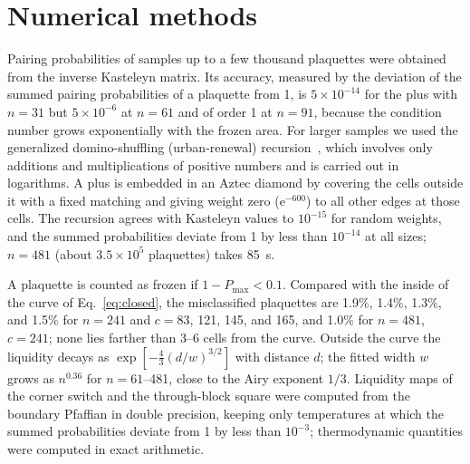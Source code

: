 \documentclass[reprint,aps,prb,floatfix,longbibliography,amsmath,amssymb]{revtex4-2}
\newcommand{\ee}{\mathrm{e}}
\newcommand{\Pmax}{P_{\max}}
\begin{document}
\section{Numerical methods}\label{app:numerics}

Pairing probabilities of samples up to a few thousand plaquettes were obtained from the inverse Kasteleyn matrix. Its accuracy, measured by the deviation of the summed pairing probabilities of a plaquette from 1, is $5\times10^{-14}$ for the plus with $n=31$ but $5\times10^{-6}$ at $n=61$ and of order 1 at $n=91$, because the condition number grows exponentially with the frozen area. For larger samples we used the generalized domino-shuffling (urban-renewal) recursion~\cite{Propp2003}, which involves only additions and multiplications of positive numbers and is carried out in logarithms. A plus is embedded in an Aztec diamond by covering the cells outside it with a fixed matching and giving weight zero ($\ee^{-600}$) to all other edges at those cells. The recursion agrees with Kasteleyn values to $10^{-15}$ for random weights, and the summed probabilities deviate from 1 by less than $10^{-14}$ at all sizes; $n=481$ (about $3.5\times10^5$ plaquettes) takes 85~s.

A plaquette is counted as frozen if $1-\Pmax<0.1$. Compared with the inside of the curve of Eq.~\eqref{eq:closed}, the misclassified plaquettes are 1.9\%, 1.4\%, 1.3\%, and 1.5\% for $n=241$ and $c=83$, 121, 145, and 165, and 1.0\% for $n=481$, $c=241$; none lies farther than 3--6 cells from the curve. Outside the curve the liquidity decays as $\exp[-\frac43(d/w)^{3/2}]$ with distance $d$; the fitted width $w$ grows as $n^{0.36}$ for $n=61$--481, close to the Airy exponent $1/3$. Liquidity maps of the corner switch and the through-block square were computed from the boundary Pfaffian in double precision, keeping only temperatures at which the summed probabilities deviate from 1 by less than $10^{-3}$; thermodynamic quantities were computed in exact arithmetic.


\end{document}
